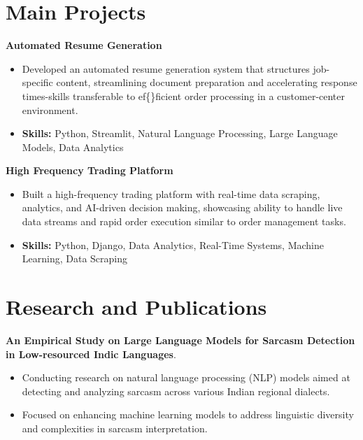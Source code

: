\documentclass[a4paper,11pt]{article}
\begin{document}
\section{\textbf{Main Projects}}

\vspace{1mm}
  \textbf{Automated Resume Generation  }
\vspace{-1.5mm} %
\begin{itemize}
  \item Developed an automated resume generation system that structures job-specific content, streamlining document preparation and accelerating response times-skills transferable to ef\{\}ficient order processing in a customer-center environment.
\vspace{-3mm}
  \item \textbf{Skills:} Python, Streamlit, Natural Language Processing, Large Language Models, Data Analytics
\end{itemize}


\vspace{1mm}
   \textbf{High Frequency Trading Platform }
\vspace{-1.5mm} %
\begin{itemize}
  \item Built a high-frequency trading platform with real-time data scraping, analytics, and AI-driven decision making, showcasing ability to handle live data streams and rapid order execution similar to order management tasks.
\vspace{-3mm}
  \item \textbf{Skills:} Python, Django, Data Analytics, Real-Time Systems, Machine Learning, Data Scraping
\end{itemize}



\section{\textbf{Research and Publications} \hfill }
\vspace{1mm}
  \textbf{An Empirical Study on Large Language Models for Sarcasm Detection in Low-resourced Indic Languages}.
\vspace{-1mm} %
\begin{itemize}
  \item Conducting research on natural language processing (NLP) models aimed at detecting and analyzing sarcasm across various Indian regional dialects.
\vspace{-3mm}
  \item Focused on enhancing machine learning models to address linguistic diversity and complexities in sarcasm interpretation.
\end{itemize}
\end{document}
